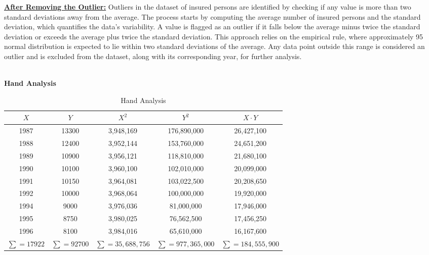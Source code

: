 \documentclass[12pt]{article}
\begin{document}
\begin{adjustwidth}{0cm}{0cm}
\uline{\textbf{After Removing the Outlier:}}
Outliers in the dataset of insured persons are identified by checking if any value is more
than two standard deviations away from the average. The process starts by computing
the average number of insured persons and the standard deviation, which quantifies the
data's variability. A value is flagged as an outlier if it falls below the average minus
twice the standard deviation or exceeds the average plus twice the standard deviation.
This approach relies on the empirical rule, where approximately 95%
normal distribution is expected to lie within two standard deviations of the average.
Any data point outside this range is considered an outlier and is excluded from the
dataset, along with its corresponding year, for further analysis.\\ \\
\end{adjustwidth}
\begin{adjustwidth}{0cm}{0cm}
\textbf{Hand Analysis}
\end{adjustwidth}
\begin{table}[h!]
    \centering
    \caption{Hand Analysis}
    \begin{tabular}{ccccc}
        \toprule
        \(X\) & \(Y\) & \(X^2\) & \(Y^2\) & \(X \cdot Y\) \\
        \midrule
        1987 & 13300 & 3,948,169 & 176,890,000 & 26,427,100 \\
        1988 & 12400 & 3,952,144 & 153,760,000 & 24,651,200 \\
        1989 & 10900 & 3,956,121 & 118,810,000 & 21,680,100 \\
        1990 & 10100 & 3,960,100 & 102,010,000 & 20,099,000 \\
        1991 & 10150 & 3,964,081 & 103,022,500 & 20,208,650 \\
        1992 & 10000 & 3,968,064 & 100,000,000 & 19,920,000 \\
        1994 & 9000 & 3,976,036 & 81,000,000 & 17,946,000 \\
        1995 & 8750 & 3,980,025 & 76,562,500 & 17,456,250 \\
        1996 & 8100 & 3,984,016 & 65,610,000 & 16,167,600 \\
        \midrule
        \(\sum = 17922\) & \(\sum = 92700\) & \(\sum = 35,688,756\) & \(\sum = 977,365,000\) & \(\sum = 184,555,900\) \\
        \bottomrule
    \end{tabular}
\end{table}
\end{document}
